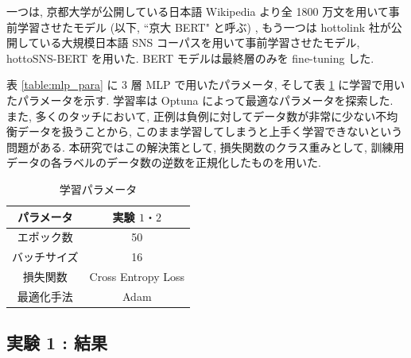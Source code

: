 \newpage

一つは, 京都大学が公開している日本語 Wikipedia より全 1800 万文を用いて事前学習させたモデル \cite{kyoto-bert} (以下, ``京大 BERT" と呼ぶ) , もう一つは hottolink 社が公開している大規模日本語 SNS コーパスを用いて事前学習させたモデル, hottoSNS-BERT \cite{hottoSNS-bert} を用いた. BERT モデルは最終層のみを fine-tuning した.

表 \ref{table:mlp_para} に 3 層 MLP で用いたパラメータ, そして表 \ref{table:ex_para} に学習で用いたパラメータを示す. 学習率は Optuna \cite{optuna_2019} によって最適なパラメータを探索した.
また, 多くのタッチにおいて, 正例は負例に対してデータ数が非常に少ない不均衡データを扱うことから, このまま学習してしまうと上手く学習できないという問題がある. 本研究ではこの解決策として, 損失関数のクラス重みとして, 訓練用データの各ラベルのデータ数の逆数を正規化したものを用いた.

\begin{table}[htb]
\caption{各実験における MLP のパラメータ}
\label{table:mlp_para}
\centering
{}
\end{table}

\begin{table}[htb]
\caption{学習パラメータ}
\label{table:ex_para}
\centering
\begin{tabular}{|c||c|c|}
\hline
パラメータ & \multicolumn{2}{|c|}{実験 $1・2$} \\ \hline
エポック数 & \multicolumn{2}{|c|}{50}  \\ \hline
バッチサイズ & \multicolumn{2}{|c|}{16} \\ \hline
損失関数 & \multicolumn{2}{|c|}{Cross Entropy Loss} \\ \hline
最適化手法 & \multicolumn{2}{|c|}{Adam} \\ \hline
\end{tabular}
\end{table}

\newpage
\changeindent{0cm}
\subsection{実験 1 : 結果}
\changeindent{2cm}

